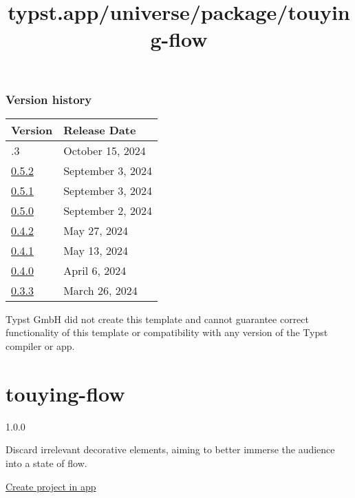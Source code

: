 \label{versions}
\subsubsection{Version history}\label{version-history}

\begin{longtable}[]{@{}ll@{}}
\toprule\noalign{}
Version & Release Date \\
\midrule\noalign{}
\endhead
\bottomrule\noalign{}
\endlastfoot
0.5.3 & October 15, 2024 \\
\href{https://typst.app/universe/package/touying-aqua/0.5.2/}{0.5.2} &
September 3, 2024 \\
\href{https://typst.app/universe/package/touying-aqua/0.5.1/}{0.5.1} &
September 3, 2024 \\
\href{https://typst.app/universe/package/touying-aqua/0.5.0/}{0.5.0} &
September 2, 2024 \\
\href{https://typst.app/universe/package/touying-aqua/0.4.2/}{0.4.2} &
May 27, 2024 \\
\href{https://typst.app/universe/package/touying-aqua/0.4.1/}{0.4.1} &
May 13, 2024 \\
\href{https://typst.app/universe/package/touying-aqua/0.4.0/}{0.4.0} &
April 6, 2024 \\
\href{https://typst.app/universe/package/touying-aqua/0.3.3/}{0.3.3} &
March 26, 2024 \\
\end{longtable}

Typst GmbH did not create this template and cannot guarantee correct
functionality of this template or compatibility with any version of the
Typst compiler or app.


\title{typst.app/universe/package/touying-flow}

\label{banner}
\label{template-thumbnail}

\section{touying-flow}\label{touying-flow}

{ 1.0.0 }

Discard irrelevant decorative elements, aiming to better immerse the
audience into a state of flow.

\href{/app?template=touying-flow&version=1.0.0}{Create project in app}

